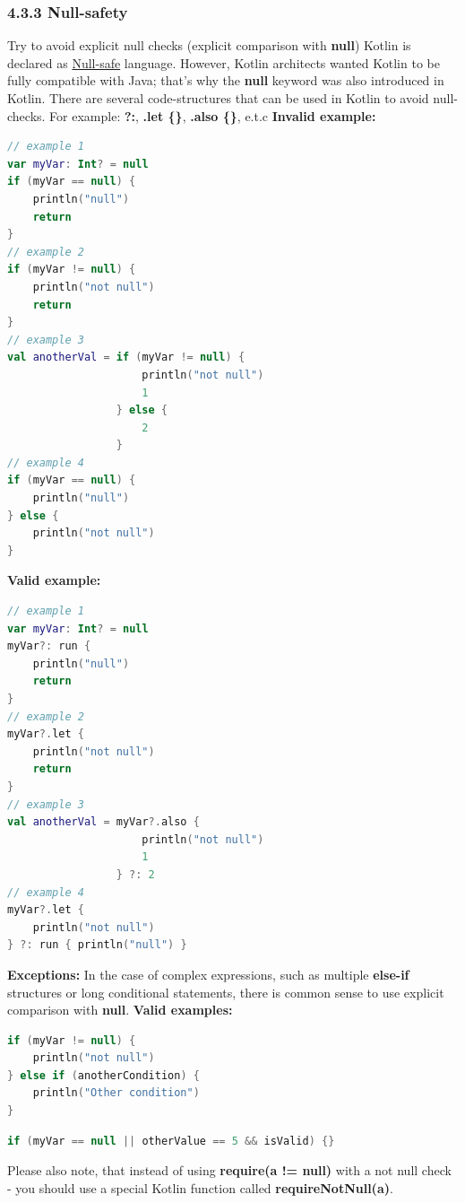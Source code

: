 \subsubsection*{\textbf{4.3.3 Null-safety}}
\leavevmode\newline
\label{sec:4.3.3}
Try to avoid explicit null checks (explicit comparison with \textbf{null}) 
Kotlin is declared as \href{https://kotlinlang.org/docs/reference/null-safety.html}{Null-safe} language.
However, Kotlin architects wanted Kotlin to be fully compatible with Java; that's why the \textbf{null} keyword was also introduced in Kotlin. 
There are several code-structures that can be used in Kotlin to avoid null-checks. For example: \textbf{?:},  \textbf{.let \{\}}, \textbf{.also \{\}}, e.t.c
\textbf{Invalid example:}
\begin{lstlisting}[language=Kotlin]
// example 1
var myVar: Int? = null
if (myVar == null) {
    println("null")
    return
}
// example 2
if (myVar != null) {
    println("not null")
    return
}
// example 3
val anotherVal = if (myVar != null) {
                     println("not null")
                     1
                 } else {
                     2
                 }
// example 4
if (myVar == null) {
    println("null")
} else {
    println("not null")
}
\end{lstlisting}
\textbf{Valid example:}
\begin{lstlisting}[language=Kotlin]
// example 1
var myVar: Int? = null
myVar?: run {
    println("null")
    return
}
// example 2
myVar?.let {
    println("not null")
    return
}
// example 3
val anotherVal = myVar?.also {
                     println("not null")
                     1
                 } ?: 2
// example 4
myVar?.let {
    println("not null")
} ?: run { println("null") }
\end{lstlisting}
\textbf{Exceptions:}
In the case of complex expressions, such as multiple \textbf{else-if} structures or long conditional statements, there is common sense to use explicit comparison with \textbf{null}.
\textbf{Valid examples:}
\begin{lstlisting}[language=Kotlin]
if (myVar != null) {
    println("not null")
} else if (anotherCondition) {
    println("Other condition")
}
\end{lstlisting}
\begin{lstlisting}[language=Kotlin]
if (myVar == null || otherValue == 5 && isValid) {}
\end{lstlisting}
Please also note, that instead of using \textbf{require(a != null)} with a not null check - you should use a special Kotlin function called \textbf{requireNotNull(a)}.
